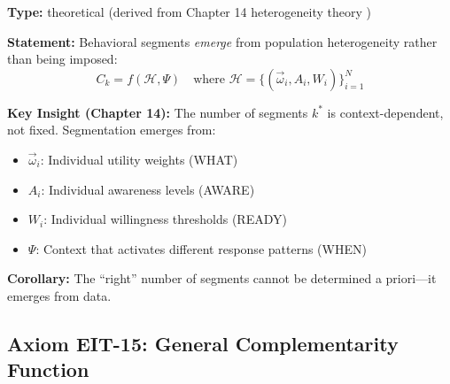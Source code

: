 \begin{tcolorbox}[colback=blue!5!white, colframe=blue!75!black,
    title=\textbf{Axiom EIT-14: Segment Emergence from Heterogeneity}]

\textbf{Type:} theoretical (derived from Chapter 14 heterogeneity theory \citep{athey2016recursive, wager2018estimation})

\textbf{Statement:} Behavioral segments \textit{emerge} from population heterogeneity rather than being imposed:
\begin{equation}
\boxed{C_k = f(\mathcal{H}, \Psi) \quad \text{where } \mathcal{H} = \{(\vec{\omega}_i, A_i, W_i)\}_{i=1}^{N}}
\label{eq:ie-segment-emergence}
\end{equation}

\textbf{Key Insight (Chapter 14):} The number of segments $k^*$ is context-dependent, not fixed. Segmentation emerges from:
\begin{itemize}[nosep]
    \item $\vec{\omega}_i$: Individual utility weights (WHAT)
    \item $A_i$: Individual awareness levels (AWARE)
    \item $W_i$: Individual willingness thresholds (READY)
    \item $\Psi$: Context that activates different response patterns (WHEN)
\end{itemize}

\textbf{Corollary:} The ``right'' number of segments cannot be determined a priori---it emerges from data.

\end{tcolorbox}

\subsection{Axiom EIT-15: General Complementarity Function}

